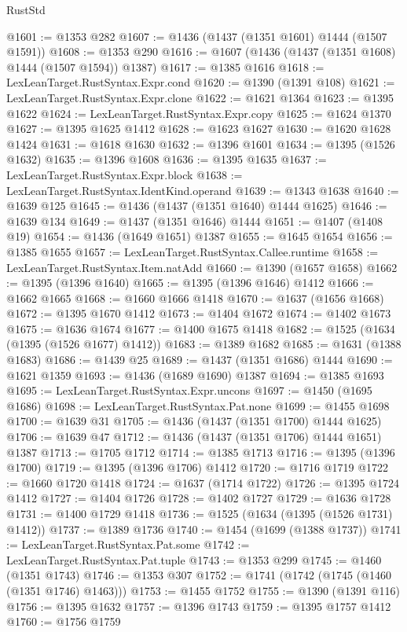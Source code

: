 \begin{lexlean}{RustStd}
\begin{coremodule}
{\begin{coremodule}
{{{{{{{{{{@1601 := @1353 @282
@1607 := @1436 (@1437 (@1351 @1601) @1444 (@1507 @1591))
@1608 := @1353 @290
@1616 := @1607 (@1436 (@1437 (@1351 @1608) @1444 (@1507 @1594)) @1387)
@1617 := @1385 @1616
@1618 := LexLeanTarget.RustSyntax.Expr.cond
@1620 := @1390 (@1391 @108)
@1621 := LexLeanTarget.RustSyntax.Expr.clone
@1622 := @1621 @1364
@1623 := @1395 @1622
@1624 := LexLeanTarget.RustSyntax.Expr.copy
@1625 := @1624 @1370
@1627 := @1395 @1625 @1412
@1628 := @1623 @1627
@1630 := @1620 @1628 @1424
@1631 := @1618 @1630
@1632 := @1396 @1601
@1634 := @1395 (@1526 @1632)
@1635 := @1396 @1608
@1636 := @1395 @1635
@1637 := LexLeanTarget.RustSyntax.Expr.block
@1638 := LexLeanTarget.RustSyntax.IdentKind.operand
@1639 := @1343 @1638
@1640 := @1639 @125
@1645 := @1436 (@1437 (@1351 @1640) @1444 @1625)
@1646 := @1639 @134
@1649 := @1437 (@1351 @1646) @1444
@1651 := @1407 (@1408 @19)
@1654 := @1436 (@1649 @1651) @1387
@1655 := @1645 @1654
@1656 := @1385 @1655
@1657 := LexLeanTarget.RustSyntax.Callee.runtime
@1658 := LexLeanTarget.RustSyntax.Item.natAdd
@1660 := @1390 (@1657 @1658)
@1662 := @1395 (@1396 @1640)
@1665 := @1395 (@1396 @1646) @1412
@1666 := @1662 @1665
@1668 := @1660 @1666 @1418
@1670 := @1637 (@1656 @1668)
@1672 := @1395 @1670 @1412
@1673 := @1404 @1672
@1674 := @1402 @1673
@1675 := @1636 @1674
@1677 := @1400 @1675 @1418
@1682 := @1525 (@1634 (@1395 (@1526 @1677) @1412))
@1683 := @1389 @1682
@1685 := @1631 (@1388 @1683)
@1686 := @1439 @25
@1689 := @1437 (@1351 @1686) @1444
@1690 := @1621 @1359
@1693 := @1436 (@1689 @1690) @1387
@1694 := @1385 @1693
@1695 := LexLeanTarget.RustSyntax.Expr.uncons
@1697 := @1450 (@1695 @1686)
@1698 := LexLeanTarget.RustSyntax.Pat.none
@1699 := @1455 @1698
@1700 := @1639 @31
@1705 := @1436 (@1437 (@1351 @1700) @1444 @1625)
@1706 := @1639 @47
@1712 := @1436 (@1437 (@1351 @1706) @1444 @1651) @1387
@1713 := @1705 @1712
@1714 := @1385 @1713
@1716 := @1395 (@1396 @1700)
@1719 := @1395 (@1396 @1706) @1412
@1720 := @1716 @1719
@1722 := @1660 @1720 @1418
@1724 := @1637 (@1714 @1722)
@1726 := @1395 @1724 @1412
@1727 := @1404 @1726
@1728 := @1402 @1727
@1729 := @1636 @1728
@1731 := @1400 @1729 @1418
@1736 := @1525 (@1634 (@1395 (@1526 @1731) @1412))
@1737 := @1389 @1736
@1740 := @1454 (@1699 (@1388 @1737))
@1741 := LexLeanTarget.RustSyntax.Pat.some
@1742 := LexLeanTarget.RustSyntax.Pat.tuple
@1743 := @1353 @299
@1745 := @1460 (@1351 @1743)
@1746 := @1353 @307
@1752 := @1741 (@1742 (@1745 (@1460 (@1351 @1746) @1463)))
@1753 := @1455 @1752
@1755 := @1390 (@1391 @116)
@1756 := @1395 @1632
@1757 := @1396 @1743
@1759 := @1395 @1757 @1412
@1760 := @1756 @1759
}}}}}}}}}}
\end{coremodule}}
\end{coremodule}
\end{lexlean}
